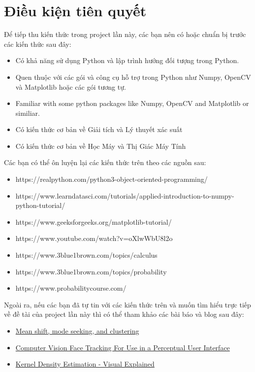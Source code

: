 \documentclass[11pt]{article}
\begin{document}
\section*{Điều kiện tiên quyết}
Để tiếp thu kiến thức trong project lần này, các bạn nên có hoặc chuẩn bị trước các kiến thức sau đây:
\begin{itemize}
    \item Có khả năng sử dụng Python và lập trình hướng đối tượng trong Python.
    \item Quen thuộc với các gói và công cụ hỗ trợ trong Python như Numpy, OpenCV và Matplotlib hoặc các gói tương tự.
    \item Familiar with some python packages like Numpy, OpenCV and Matplotlib or similiar.
    \item Có kiến thức cơ bản về Giải tích và Lý thuyết xác suất
    \item Có kiến thức cơ bản về Học Máy và Thị Giác Máy Tính
\end{itemize}
Các bạn có thể ôn luyện lại các kiến thức trên theo các nguồn sau:
\begin{itemize}
    \item https://realpython.com/python3-object-oriented-programming/
    \item https://www.learndatasci.com/tutorials/applied-introduction-to-numpy-python-tutorial/
    \item https://www.geeksforgeeks.org/matplotlib-tutorial/
    \item https://www.youtube.com/watch?v=oXlwWbU8l2o
    \item https://www.3blue1brown.com/topics/calculus
    \item https://www.3blue1brown.com/topics/probability
    \item https://www.probabilitycourse.com/
\end{itemize}
Ngoài ra, nếu các bạn đã tự tin với các kiến thức trên và muốn tìm hiểu trực tiếp về đề tài của project lần này thì có thể tham khảo các bài báo và blog sau đây:
\begin{itemize}
    \item \href{https://ieeexplore.ieee.org/document/400568}{Mean shift, mode seeking, and clustering}
    \item \href{http://opencv.jp/opencv-1.0.0_org/docs/papers/camshift.pdf}{Computer Vision Face Tracking For Use in a Perceptual User Interface}
    \item \href{https://mathisonian.github.io/kde/}{Kernel Density Estimation - Visual Explained}
\end{itemize}
\end{document}
